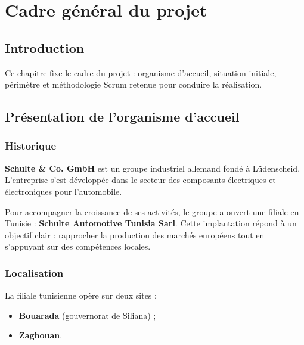 
\chapter{Cadre général du projet}

\section*{Introduction}

Ce chapitre fixe le cadre du projet : organisme d'accueil, situation
initiale, périmètre et méthodologie Scrum retenue pour conduire la
réalisation.

\section{Présentation de l'organisme d'accueil}

\subsection{Historique}

\textbf{Schulte \& Co. GmbH} est un groupe industriel allemand fondé à
Lüdenscheid. L'entreprise s'est développée dans le secteur des composants
électriques et électroniques pour l'automobile.

Pour accompagner la croissance de ses activités, le groupe a ouvert une
filiale en Tunisie : \textbf{Schulte Automotive Tunisia Sarl}. Cette
implantation répond à un objectif clair : rapprocher la production des
marchés européens tout en s'appuyant sur des compétences locales.

\subsection{Localisation}

La filiale tunisienne opère sur deux sites :
\begin{itemize}
    \item \textbf{Bouarada} (gouvernorat de Siliana) ;
    \item \textbf{Zaghouan}.
\end{itemize}

